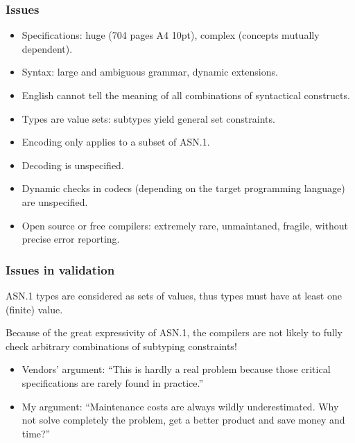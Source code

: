 \documentclass[compress,dvips,xcolor={dvipsnames},t]{beamer}
\newcommand\ASN{\textsf{ASN.1}\xspace}
\begin{document}
\begin{frame}
\frametitle{Issues}

\begin{itemize}

  \item Specifications: huge (704 pages A4 10pt), complex (concepts
  mutually dependent).

  \item Syntax: large and ambiguous grammar, dynamic extensions.

  \item English cannot tell the meaning of all combinations of
    syntactical constructs.
  
  \item Types are value sets: subtypes yield general set constraints.

  \item Encoding only applies to a subset of \ASN.

  \item Decoding is unspecified.

  \item Dynamic checks in codecs (depending on the target programming
    language) are unspecified.

  \item Open source or free compilers: extremely rare, unmaintaned,
    fragile, without precise error reporting.

\end{itemize}

\end{frame}

\begin{frame}
\frametitle{Issues in validation}

\ASN types are considered as sets of values, thus types must have at
least one (finite) value.

\bigskip

Because of the great expressivity of \ASN, the compilers are not
likely to fully check arbitrary combinations of subtyping
constraints!

\bigskip

\begin{itemize}

  \item Vendors' argument: ``This is hardly a real problem because
    those critical specifications are rarely found in practice.''

    \item My argument: ``Maintenance costs are always wildly
      underestimated. Why not solve completely the problem, get a
      better product and save money and time?''

\end{itemize}

\end{frame}
\end{document}

